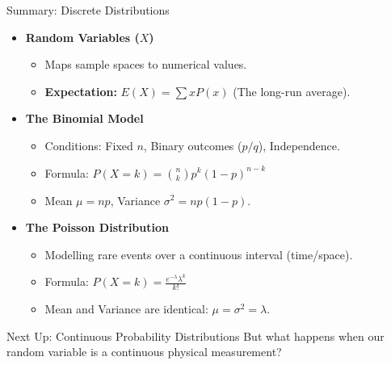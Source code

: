 \begin{frame}{Summary: Discrete Distributions}
    \small
    \begin{itemize}
        \item \textbf{Random Variables ($X$)}
            \begin{itemize}
                \item Maps sample spaces to numerical values.
                \item \textbf{Expectation:} $E(X) = \sum x P(x)$ (The long-run average).
            \end{itemize}
        \vspace{0.2cm}
        \item \textbf{The Binomial Model}
            \begin{itemize}
                \item Conditions: Fixed $n$, Binary outcomes ($p/q$), Independence.
                \item Formula: $P(X=k) = \binom{n}{k} p^k (1-p)^{n-k}$
                \item Mean $\mu = np$, Variance $\sigma^2 = np(1-p)$.
            \end{itemize}
        \vspace{0.2cm}
        \item \textbf{The Poisson Distribution}
            \begin{itemize}
                \item Modelling rare events over a continuous interval (time/space).
                \item Formula: $P(X=k) = \frac{e^{-\lambda} \lambda^k}{k!}$
                \item Mean and Variance are identical: $\mu = \sigma^2 = \lambda$.
            \end{itemize}
    \end{itemize}


    \begin{block}{Next Up: Continuous Probability Distributions}
         But what happens when our random variable is a continuous physical measurement? 
    \end{block}
\end{frame}

